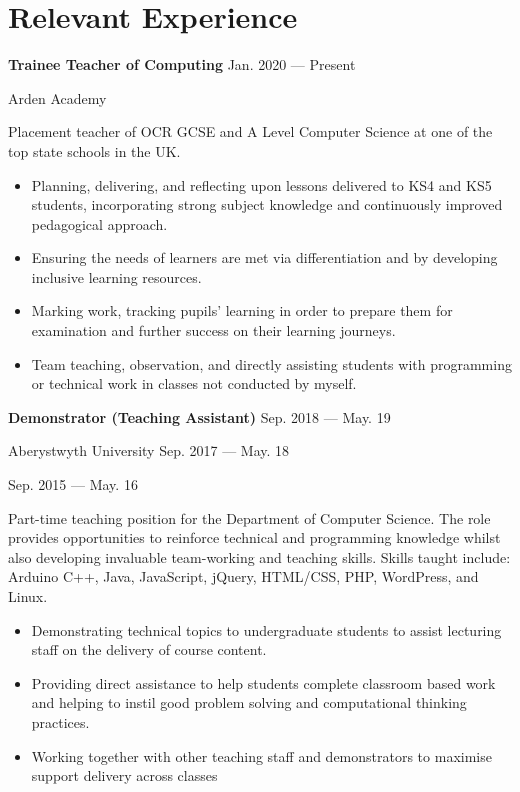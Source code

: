 \section{Relevant Experience}

\parbox[t][][t]{\linewidth}{
	\parbox{\linewidth}{{\textbf{Trainee Teacher of Computing}}
		\hfill {{Jan. 2020 --- Present}}}
	\smallbreak
	
	\parbox{\linewidth}{Arden Academy}
	
	\bigskip
	Placement teacher of OCR GCSE and A Level Computer Science at one of the top state schools in the UK.
	
	\bigskip
	\begin{itemize}
		\item{Planning, delivering, and reflecting upon lessons delivered to KS4 and KS5 students, incorporating strong subject knowledge and continuously improved pedagogical approach.}\\[-.6em]
		\item{Ensuring the needs of learners are met via differentiation and by developing inclusive learning resources.}\\[-.6em]
		\item{Marking work, tracking pupils' learning in order to prepare them for examination and further success on their learning journeys.}\\[-.6em]
		\item{Team teaching, observation, and directly assisting students with programming or technical work in classes not conducted by myself.}\\[-.6em]
	\end{itemize}
	\bigskip
	\bigskip
}

\parbox[t][][t]{\linewidth}{
	\parbox{\linewidth}{{\textbf{Demonstrator (Teaching Assistant)}
		\hfill {{Sep. 2018 --- May. 19}}}}
	\parbox{\linewidth}{{Aberystwyth University
		\hfill {{Sep. 2017 --- May. 18}}}}
		\parbox{\linewidth}{{
			\hfill {{Sep. 2015 --- May. 16}}}}
	\smallbreak
	
	\bigskip
	Part-time teaching position for the Department of Computer Science. The role provides opportunities to reinforce technical and programming knowledge
	whilst also developing invaluable team-working and teaching skills. Skills taught include: Arduino C++, Java, JavaScript, jQuery, HTML/CSS, PHP, WordPress, and Linux.
			
	\bigskip
	\begin{itemize}
		\item{Demonstrating technical topics to undergraduate students to assist lecturing staff on the delivery of course content.}\\[-.6em]
		\item{Providing direct assistance to help students complete classroom based work and helping to instil good problem solving and computational thinking practices.}\\[-.6em]
		\item{Working together with other teaching staff and demonstrators to maximise support delivery across classes}\\[-.6em]
	\end{itemize}
	\bigskip
	\bigskip
}

